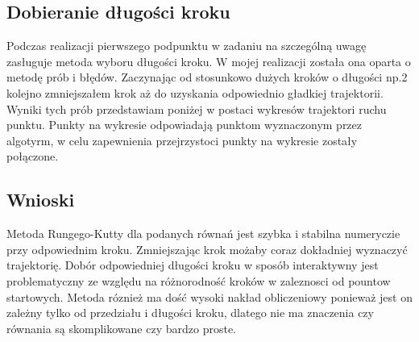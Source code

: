 \documentclass[a4paper, 11pt]{article}
\begin{document}
\subsection{Dobieranie długości kroku}
Podczas realizacji pierwszego podpunktu w zadaniu na szczególną uwagę zasługuje metoda wyboru długości kroku. W mojej realizacji została ona oparta o metodę prób i błędów. Zaczynając od stosunkowo dużych kroków o długości np.2 kolejno zmniejszałem krok aż do uzyskania odpowiednio gładkiej trajektorii. Wyniki tych prób przedstawiam poniżej w postaci wykresów trajektori ruchu punktu. Punkty na wykresie odpowiadają punktom wyznaczonym przez algotyrm, w celu zapewnienia przejrzystoci punkty na wykresie zostały połączone. 
%
%
%
%
%
%
%
%

\subsection{Wnioski}
Metoda Rungego-Kutty dla podanych równań jest szybka i stabilna numeryczie przy odpowiednim kroku. Zmniejszając krok możaby coraz dokładniej wyznaczyć trajektorię. Dobór odpowiedniej długości kroku w sposób interaktywny jest problematyczny ze względu na różnorodność kroków w zaleznosci od pountow startowych. Metoda róznież ma dość wysoki nakład obliczeniowy ponieważ jest on zależny tylko od przedziału i długości kroku, dlatego nie ma znaczenia czy równania są skomplikowane czy bardzo proste. 
\end{document}
